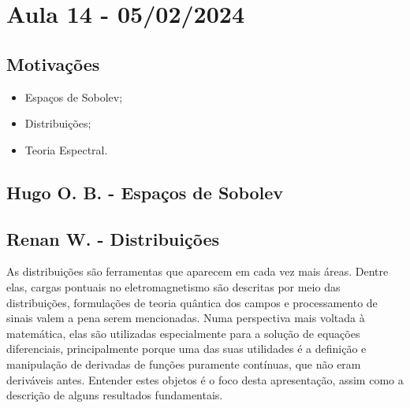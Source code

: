 \documentclass[measure_theory.tex]{subfiles}
\begin{document}
\section{Aula 14 - 05/02/2024}
\subsection{Motivações}
\begin{itemize}
	\item Espaços de Sobolev;
	\item Distribuições;
	\item Teoria Espectral.
\end{itemize}
\subsection{Hugo O. B. - Espaços de Sobolev}
\subsection{Renan W. - Distribuições}
As distribuições são ferramentas que aparecem em cada vez mais áreas. Dentre elas, cargas pontuais no eletromagnetismo são descritas por meio das distribuições,
formulações de teoria quântica dos campos e processamento de sinais valem a pena serem mencionadas. Numa perspectiva mais voltada à matemática, elas são utilizadas especialmente
para a solução de equações diferenciais, principalmente porque uma das suas utilidades é a definição e manipulação de derivadas de funções puramente contínuas, que não eram deriváveis antes.
Entender estes objetos é o foco desta apresentação, assim como a descrição de alguns resultados fundamentais.
\end{document}
